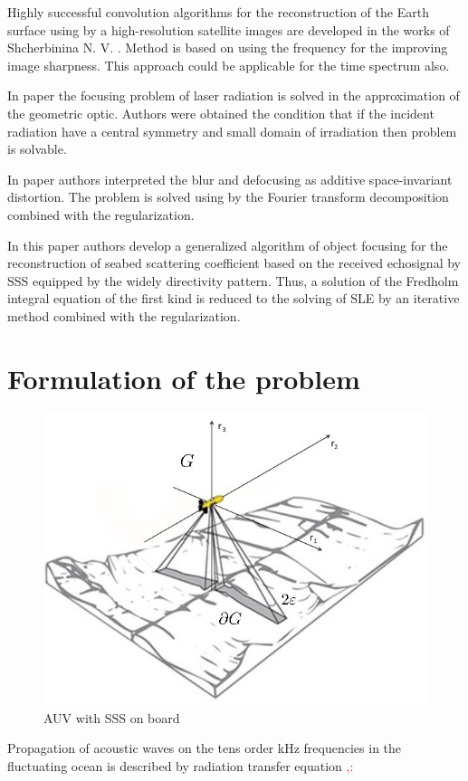 \documentclass{procDDs}
\begin{document}
Highly successful convolution algorithms for the reconstruction of  the Earth surface  using by a high-resolution satellite images are developed in the works of Shcherbinina N. V. \cite{Shcherbinina}. Method is based on using the frequency for the improving image sharpness. This approach could be applicable for the time spectrum also.

In paper \cite{p2} the focusing problem of laser radiation is solved in the approximation of the geometric optic. Authors were obtained the condition that if the incident radiation have a central symmetry and small domain of irradiation then problem is solvable.

In paper \cite{p3} authors interpreted the blur and defocusing as additive space-invariant distortion. The problem is solved using by the Fourier transform decomposition combined with the regularization.

In this paper authors develop a generalized algorithm of object focusing for the reconstruction of seabed scattering coefficient based on the received echosignal by SSS equipped by the widely directivity pattern. Thus, a solution of the Fredholm integral equation of the first kind is reduced to the solving of SLE by an iterative method combined with the regularization.

\section{Formulation of the problem}
\begin{figure}[h!]\center
	
	\includegraphics[width=1\linewidth]{img/gbo.jpg}
	\caption{AUV with SSS on board}
	\label{ris:gbo}
\end{figure}
Propagation of acoustic waves on the tens order kHz frequencies in the fluctuating ocean is described by radiation
transfer equation \textcolor{red}{\cite{p11},\cite{p12}:}
\end{document}

